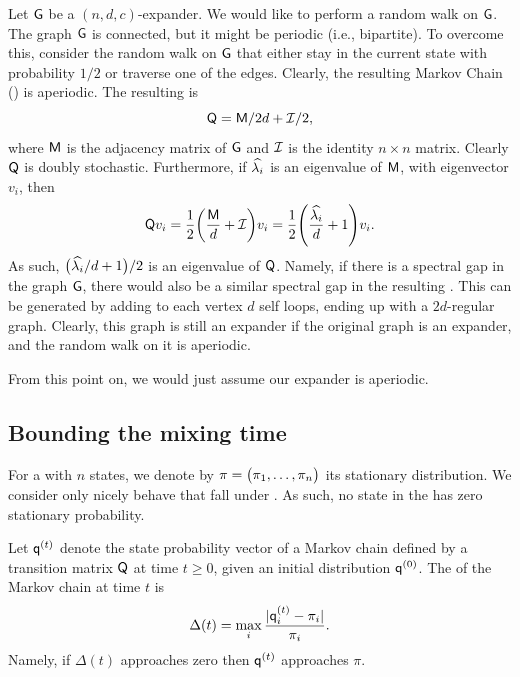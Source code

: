 Let $\mathsf{G}$ be a $(n,d,c)$-expander. We would like to perform a
random walk on $\mathsf{G}$. The graph $\mathsf{G}$ is connected, but it might
be periodic (i.e., bipartite). To overcome this, consider the random
walk on $\mathsf{G}$ that either stay in the current state with
probability $1/2$ or traverse one of the edges. Clearly, the resulting
Markov Chain (\MC) is aperiodic. The resulting  is
\begin{equation*}
    \mathsf{Q} = \mathsf{M} / 2d + \mathcal{I}/2,
\end{equation*}
where $\mathsf{M}$ is the adjacency matrix of $\mathsf{G}$ and $\mathcal{I}$ is the
identity $n\times n$ matrix. Clearly $\mathsf{Q}$ is doubly
stochastic. Furthermore, if $\widehat{\lambda_{i}}$ is an eigenvalue of $\mathsf{M}$, with
eigenvector $v_i$, then
\begin{equation*}
    \TMtrx v_i%
    =%
    \frac{1}{2} \pth[]{ \frac{\Mtrx}{d} + \IMtrx} v_i%
    =%
    \frac{1}{2} \pth[]{ \frac{\EV{i}}{d} + 1} v_i.
\end{equation*}
As such, $\bigl(\widehat{\lambda_{i}}/{d} + 1 \bigr)/2$ is an eigenvalue of
$\mathsf{Q}$. Namely, if there is a spectral gap in the graph
$\mathsf{G}$, there would also be a similar spectral gap in the resulting
\MC. This \MC can be generated by adding to each vertex
$d$ self loops, ending up with a
$2d$-regular graph. Clearly, this graph is still an expander if the
original graph is an expander, and the random walk on it is aperiodic.

From this point on, we would just assume our expander is aperiodic.


\subsection{Bounding the mixing time}

For a \MC with $n$ states, we denote by
$\pi = \pth[]{\bigl.\pi_1, \ldots, \pi_n}$ its stationary
distribution. We consider only nicely behave \MC that fall under
. As such, no state in the \MC has zero stationary
probability.

\begin{defn}
    Let $\mathbf{\mathsf{q}}^{(t)}$ denote the state probability vector of a Markov
    chain defined by a transition matrix $\mathsf{Q}$ at time $t \geq 0$,
    given an initial distribution $\mathbf{\mathsf{q}}^{(0)}$. The  of the Markov chain at time $t$ is
    \begin{equation*}
        \Delta(t)%
        =%
        \max_i \frac{|\DstrbE{t}{i} - \pi_i|}{\pi_i}.
    \end{equation*}
    Namely, if $\Delta(t)$ approaches zero then $\mathbf{\mathsf{q}}^{(t)}$
    approaches $\pi$.
\end{defn}

